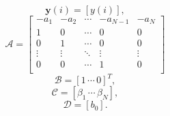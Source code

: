 $$ \bm{y}(i) = [y(i)], $$
$$ \mathcal{A} = \left[
\begin{array}{ccccc}
	-a_{1} & -a_{2} & \cdots & -a_{N-1} & -a_{N} \\
	1      & 0      & \cdots & 0        & 0      \\
	0      & 1      & \cdots & 0        & 0      \\
	\vdots & \vdots & \ddots & \vdots   & \vdots \\
	0      & 0      & \cdots & 1        & 0      \\
\end{array}
\right] $$
$$ \mathcal{B} = [1 \, \cdots \, 0]^{T}, $$
$$ \mathcal{C} = [\beta_{1} \, \cdots \, \beta_{N}], $$
$$ \mathcal{D} = [b_{0}]. $$